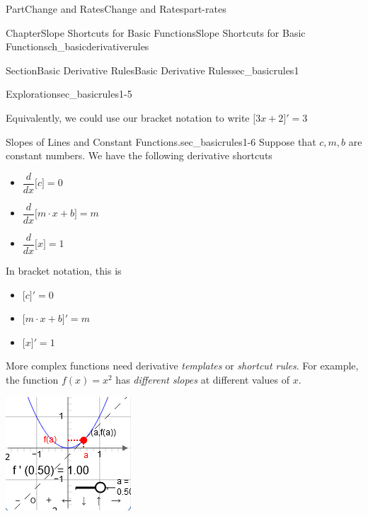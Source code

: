 \documentclass[oneside,10pt,]{tufte-book}
\numberwithin{equation}{chapter}
\newcommand{\ddx}[1]{ \dfrac{d}{dx} \Big[ #1 \Big]  }
\newcommand{\D}[1]{ \Big[ #1 \Big]'  }
\begin{document}
\begin{partptx}{Part}{Change and Rates}{}{Change and Rates}{}{}{part-rates}
\begin{chapterptx}{Chapter}{Slope Shortcuts for Basic Functions}{}{Slope Shortcuts for Basic Functions}{}{}{ch_basicderivativerules}
\begin{sectionptx}{Section}{Basic Derivative Rules}{}{Basic Derivative Rules}{}{}{sec_basicrules1}
\begin{exploration}{Exploration}{}{sec_basicrules1-5}
\par
Equivalently, we could use our bracket notation to write \(\D{ 3x + 2} = 3\)%
\end{exploration}%
\begin{paragraphs}{Slopes of Lines and Constant Functions.}{sec_basicrules1-6}%
Suppose that \(c,m,b\) are constant numbers.  We have the following derivative shortcuts%
%
\begin{itemize}[label=\textbullet]
\item{}\(\displaystyle \ddx{c} = 0\)%
\item{}\(\displaystyle \ddx{m\cdot x + b} = m\)%
\item{}\(\displaystyle \ddx{x} = 1\)%
\end{itemize}
 In bracket notation, this is %
\begin{itemize}[label=\textbullet]
\item{}\(\displaystyle \D{c} = 0\)%
\item{}\(\displaystyle \D{m\cdot x + b} = m\)%
\item{}\(\displaystyle \D{x} = 1\)%
\end{itemize}
\end{paragraphs}%
\par\medskip
More complex functions need derivative \emph{templates} or \emph{shortcut rules}. For example, the function \(f(x) = x^2\) has \emph{different slopes} at different values of \(x\). \begin{sidebyside}{2}{0.075}{0.075}{0.17}%
\begin{sbspanel}{0.47}%
\includegraphics[width=\linewidth]{external/jsxgraph-findingslopefromtangent-exercise2b.png}

\end{sbspanel}
\end{sidebyside}
\end{sectionptx}
\end{chapterptx}
\end{partptx}
\end{document}
